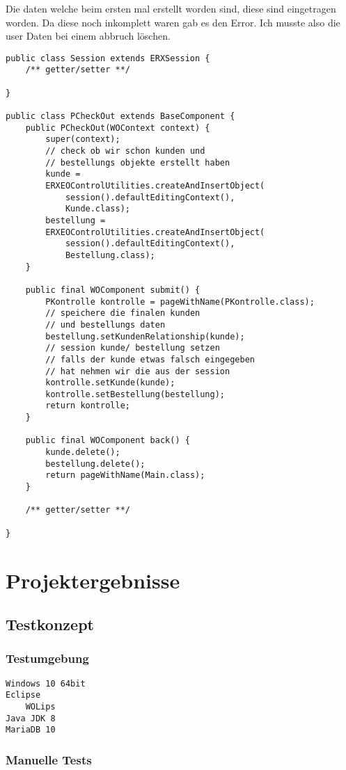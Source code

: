 \documentclass[a4paper, 11pt]{article}
\begin{document}
Die daten welche beim ersten mal erstellt worden sind, diese sind eingetragen worden.
Da diese noch inkomplett waren gab es den Error.
Ich musste also die user Daten bei einem abbruch löschen.

\begin{verbatim}
public class Session extends ERXSession {
	/** getter/setter **/

}

public class PCheckOut extends BaseComponent {
	public PCheckOut(WOContext context) {
		super(context);
		// check ob wir schon kunden und 
		// bestellungs objekte erstellt haben
		kunde =
		ERXEOControlUtilities.createAndInsertObject(
			session().defaultEditingContext(), 
			Kunde.class);
		bestellung = 
		ERXEOControlUtilities.createAndInsertObject(
			session().defaultEditingContext(), 
			Bestellung.class);
	}

	public final WOComponent submit() {
		PKontrolle kontrolle = pageWithName(PKontrolle.class);
		// speichere die finalen kunden
		// und bestellungs daten
		bestellung.setKundenRelationship(kunde);
		// session kunde/ bestellung setzen
		// falls der kunde etwas falsch eingegeben 
		// hat nehmen wir die aus der session
		kontrolle.setKunde(kunde);
		kontrolle.setBestellung(bestellung);
		return kontrolle;
	}

	public final WOComponent back() {
		kunde.delete();
		bestellung.delete();
		return pageWithName(Main.class);
	}

	/** getter/setter **/

}
\end{verbatim}

\section{Projektergebnisse}

\subsection{Testkonzept}

\subsubsection{Testumgebung}

\begin{verbatim}
Windows 10 64bit
Eclipse
    WOLips
Java JDK 8
MariaDB 10
\end{verbatim}

\subsubsection{Manuelle Tests}
\end{document}
